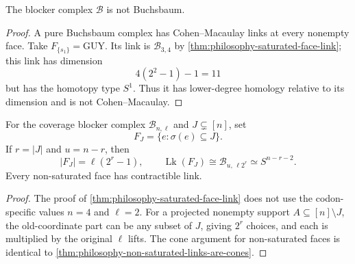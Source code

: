 \begin{theorem}
\label{thm:philosophy-blocker-not-buchsbaum}
The blocker complex $\mathcal{B}$ is not Buchsbaum.
\end{theorem}
\begin{proof}
A pure Buchsbaum complex has Cohen--Macaulay links at every nonempty
face. Take $F_{\{s_{1}\}}=\mathrm{GUY}$. Its link is
$\mathcal{B}_{3,4}$ by
\autoref{thm:philosophy-saturated-face-link}; this link has dimension
$$
  4(2^{2}-1)-1=11
$$
but has the homotopy type $S^{1}$. Thus it has lower-degree homology
relative to its dimension and is not Cohen--Macaulay.
\end{proof}

\begin{theorem}
\label{thm:philosophy-universal-link-stratification}
For the coverage blocker complex $\mathcal{B}_{n,\ell}$ and
$J\subsetneq[n]$, set
$$
  F_{J}=\{e:\sigma(e)\subseteq J\}.
$$
If $r=|J|$ and $u=n-r$, then
$$
  |F_{J}|=\ell(2^{r}-1),
  \qquad
  \operatorname{Lk}(F_{J})
  \cong
  \mathcal{B}_{u,\,\ell2^{r}}
  \simeq
  S^{n-r-2}.
$$
Every non-saturated face has contractible link.
\end{theorem}
\begin{proof}
The proof of \autoref{thm:philosophy-saturated-face-link} does not use
the codon-specific values $n=4$ and $\ell=2$. For a projected nonempty
support $A\subseteq[n]\setminus J$, the old-coordinate part can be any
subset of $J$, giving $2^{r}$ choices, and each is multiplied by the
original $\ell$ lifts. The cone argument for non-saturated faces is
identical to \autoref{thm:philosophy-non-saturated-links-are-cones}.
\end{proof}

